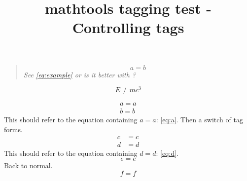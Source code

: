 \documentclass{article}
\title{mathtools tagging test - Controlling tags}
\begin{document}
\begin{quote}\normalfont\itshape
\begin{equation*}
a=b \label{eq:example}\tag*{Q\&A}
\end{equation*}
See \ref{eq:example} or is it better with ?
\end{quote}

\begin{equation}
E \neq m c^3
\end{equation}

\begin{gather}
a=a \label{eq:a} \\
b=b \label{eq:b} \tag{**}
\end{gather}
This should refer to the equation containing $a=a$: \eqref{eq:a}.
Then a switch of tag forms.
\begin{align}
c&=c \label{eq:c} \\
d&=d \label{eq:d}
\end{align}
This should refer to the equation containing $d=d$: \eqref{eq:d}.
\begin{equation}
e=e
\end{equation}
Back to normal.
\begin{equation}
f=f
\end{equation}
\end{document}
